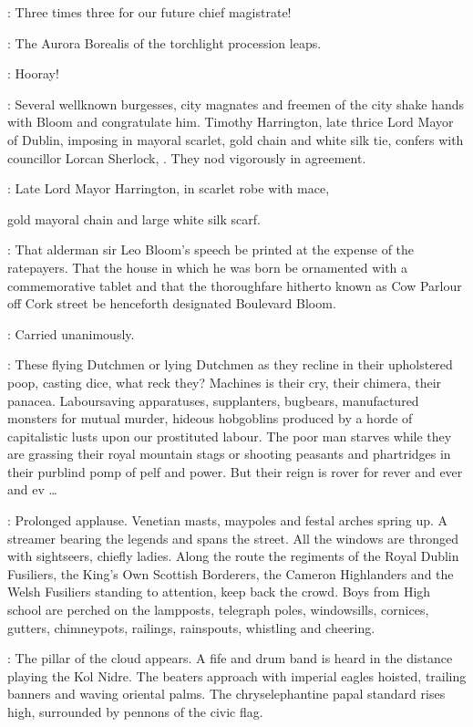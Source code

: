 \Elector:
Three times three for our future chief magistrate!

:
The Aurora Borealis of the torchlight procession leaps.

\Torchbearers:
Hooray!

:
Several wellknown burgesses,
city magnates and freemen of the city
shake hands with Bloom and congratulate him.
Timothy Harrington,
late thrice Lord Mayor of Dublin,
imposing in mayoral scarlet,
gold chain and white silk tie,
confers with councillor Lorcan Sherlock,
.
They nod vigorously in agreement.

:
Late Lord Mayor Harrington,
in scarlet robe with mace,

gold mayoral chain and large white silk scarf.

\Harrington:
That alderman sir Leo Bloom's speech be printed at the expense of the ratepayers.
That the house in which he was born be ornamented with a commemorative tablet
and that the thoroughfare hitherto known as Cow Parlour off Cork street
be henceforth designated Boulevard Bloom.

\Lorcan[2]:
Carried unanimously.

\Bloom:
These flying Dutchmen or lying Dutchmen as they recline
in their upholstered poop,
casting dice,
what reck they?
Machines is their cry,
their chimera,
their panacea.
Laboursaving apparatuses,
supplanters,
bugbears,
manufactured monsters for mutual murder,
hideous hobgoblins produced by
a horde of capitalistic lusts upon our prostituted labour.
The poor man starves while they are grassing their royal mountain stags
or shooting peasants and phartridges in their purblind pomp of pelf and power.
But their reign is rover for rever and ever and ev \ldots

:
Prolonged applause.
Venetian masts,
maypoles and festal arches spring up.
A streamer bearing the legends  and
 spans the street.
All the windows are thronged with sightseers,
chiefly ladies.
Along the route the regiments of the Royal Dublin Fusiliers,
the King's Own Scottish Borderers,
the Cameron Highlanders
and the Welsh Fusiliers standing to attention,
keep back the crowd.
Boys from High school are perched on the lampposts,
telegraph poles,
windowsills,
cornices,
gutters,
chimneypots,
railings,
rainspouts,
whistling and cheering.

:
The pillar of the cloud appears.
A fife and drum band is heard in the distance playing the Kol Nidre.
The beaters approach with imperial eagles hoisted,
trailing banners and waving oriental palms.
The chryselephantine papal standard rises high,
surrounded by pennons of the civic flag.

